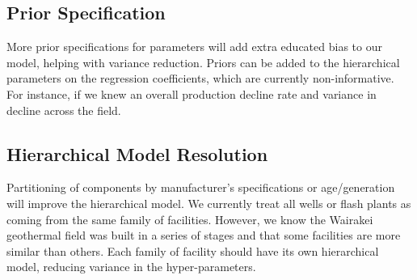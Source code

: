 \documentclass[a4paper, 12pt]{article}
\begin{document}
\subsection{Prior Specification}
More prior specifications for parameters will add extra educated bias to our model, helping with variance reduction. Priors can be added to the hierarchical parameters on the regression coefficients, which are currently non-informative. For instance, if we knew an overall production decline rate and variance in decline across the field.

\subsection{Hierarchical Model Resolution}
Partitioning of components by manufacturer's specifications or age/generation will improve the hierarchical model. We currently treat all wells or flash plants as coming from the same family of facilities. However, we know the Wairakei geothermal field was built in a series of stages and that some facilities are more similar than others. Each family of facility should have its own hierarchical model, reducing variance in the hyper-parameters.
\end{document}
